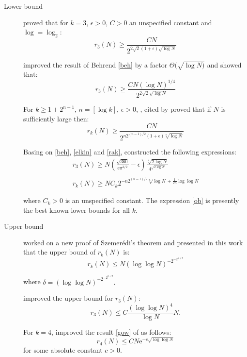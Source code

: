 \begin{description}
\item[Lower bound]
\cite{behrend1946sets} proved that for $k=3$, $\epsilon >0$, $C>0$ an unspecified constant and $\log =\log_2 $:
\begin{equation}
r_3(N) \geq \frac{CN}{2^{2\sqrt{2}(1+\epsilon) \sqrt{\log N}}} \label{beh}
\end{equation}

\cite{elkin2010improved} improved the result of Behrend \eqref{beh} by a factor $\Theta (\sqrt{\log N)}$ and showed that:
\begin{equation}
r_3(N) \geq \frac{CN (\log N)^{1/4}}{2^{2\sqrt{2} \sqrt{\log N}}} \label{elkin}
\end{equation}

For $k \geq 1+2^{n-1}$,  $n=[\log k]$, $\epsilon >0$, \cite{rankin1961xxiv}, cited by \cite{o2011sets} proved that if $N$ is sufficiently large then:
\begin{equation}
r_k(N) \geq \frac{CN}{2^{n2^{(n-1)/2}(1+\epsilon) \sqrt[n]{\log N}}} \label{rak}
\end{equation}

Basing on \eqref{beh}, \eqref{elkin} and \eqref{rak}, \cite{o2011sets} constructed  the following expressions:
\begin{align}
r_3(N) \geq N \left( \frac{\sqrt{360}}{\mathrm{e}\pi^{3/2}}-\epsilon \right) \frac{\sqrt[4]{2\log N}}{4^{\sqrt{2\log N}}} \label{r31}\\ 
 \nonumber \\
r_k(N) \geq NC_k 2^{-n2^{(n-1)/2} \sqrt[n]{\log N} +\frac{1}{2n} \log \log N } \label{ob}
\end{align}

where $C_k >0$ is an unspecified constant. The expression \eqref{ob} is presently the best known  lower bounds for all $k.$

\item[Upper bound]
\cite{gowers2001new} worked on a new proof of Szemerédi's theorem and presented in this work that the upper bound of $r_k(N)$ is:
\begin{equation}
r_k(N) \leq N \left(\log \log N\right)^{-2^{-2^{k+9}}} \label{gow}
\end{equation}

where $\delta= \left(\log \log N\right)^{-2^{-2^{k+9}}}.$

\cite{bloom2016quantitative} improved the upper bound for $r_3(N):$
\begin{equation}
r_3(N) \leq C \frac{(\log \log N)^4}{\log N} N. \label{r32}
\end{equation}

For $k=4$, \cite{green2006new} improved the result \eqref{gow} of \cite{gowers2001new} as follows:
\begin{equation}
r_4(N) \leq C N\mathrm{e}^{-c\sqrt{\log \log N}} \label{r4}
\end{equation}
for some absolute constant $c > 0.$
\end{description}

